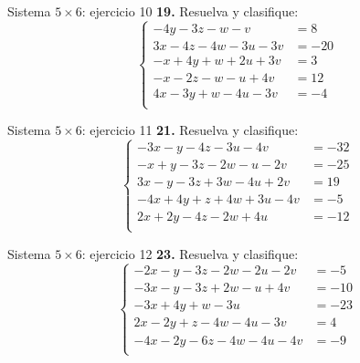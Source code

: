 \documentclass[aspectratio=169]{beamer}
\begin{document}
\begin{frame}{Sistema $5\times 6$: ejercicio 10}
\scriptsize
\textbf{19.} Resuelva y clasifique:
\[\left\{\begin{aligned}
-4y-3z-w-v&=8\\
3x-4z-4w-3u-3v&=-20\\
-x+4y+w+2u+3v&=3\\
-x-2z-w-u+4v&=12\\
4x-3y+w-4u-3v&=-4\\
\end{aligned}\right.\]
\end{frame}
\begin{frame}{Sistema $5\times 6$: ejercicio 11}
\scriptsize
\textbf{21.} Resuelva y clasifique:
\[\left\{\begin{aligned}
-3x-y-4z-3u-4v&=-32\\
-x+y-3z-2w-u-2v&=-25\\
3x-y-3z+3w-4u+2v&=19\\
-4x+4y+z+4w+3u-4v&=-5\\
2x+2y-4z-2w+4u&=-12\\
\end{aligned}\right.\]
\end{frame}
\begin{frame}{Sistema $5\times 6$: ejercicio 12}
\scriptsize
\textbf{23.} Resuelva y clasifique:
\[\left\{\begin{aligned}
-2x-y-3z-2w-2u-2v&=-5\\
-3x-y-3z+2w-u+4v&=-10\\
-3x+4y+w-3u&=-23\\
2x-2y+z-4w-4u-3v&=4\\
-4x-2y-6z-4w-4u-4v&=-9\\
\end{aligned}\right.\]
\end{frame}
\end{document}
